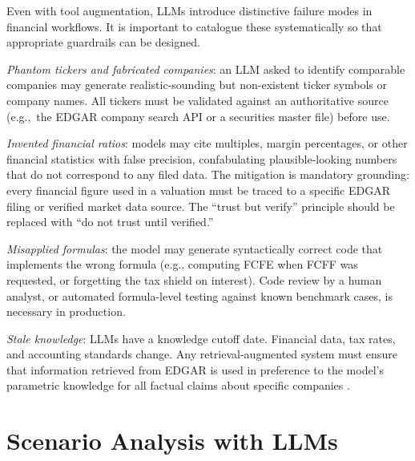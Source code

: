 \begin{deepdive}
Even with tool augmentation, LLMs introduce distinctive failure modes in financial
workflows. It is important to catalogue these systematically so that appropriate
guardrails can be designed.

\emph{Phantom tickers and fabricated companies}: an LLM asked to identify comparable
companies may generate realistic-sounding but non-existent ticker symbols or company
names. All tickers must be validated against an authoritative source (e.g.,\ the EDGAR
company search API or a securities master file) before use.

\emph{Invented financial ratios}: models may cite multiples, margin percentages, or
other financial statistics with false precision, confabulating plausible-looking numbers
that do not correspond to any filed data. The mitigation is mandatory grounding:
every financial figure used in a valuation must be traced to a specific EDGAR filing
or verified market data source. The ``trust but verify'' principle should be replaced
with ``do not trust until verified.''

\emph{Misapplied formulas}: the model may generate syntactically correct code that
implements the wrong formula (e.g., computing FCFE when FCFF was requested, or
forgetting the tax shield on interest). Code review by a human analyst, or automated
formula-level testing against known benchmark cases, is necessary in production.

\emph{Stale knowledge}: LLMs have a knowledge cutoff date. Financial data, tax rates,
and accounting standards change. Any retrieval-augmented system must ensure that
information retrieved from EDGAR is used in preference to the model's parametric
knowledge for all factual claims about specific companies \citep{zhang2024financebench}.
\end{deepdive}


\section{Scenario Analysis with LLMs}
\label{sec:bv-scenarios}

